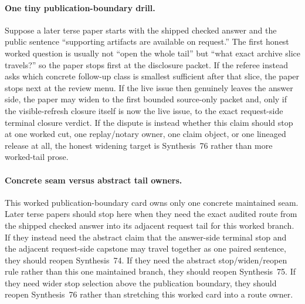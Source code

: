 \documentclass[11pt]{article}
\begin{document}
\paragraph{One tiny publication-boundary drill.}
Suppose a later terse paper starts with the shipped checked answer and the public sentence ``supporting artifacts are available on request.'' The first honest worked question is usually not ``open the whole tail'' but ``what exact archive slice travels?'' so the paper stops first at the disclosure packet. If the referee instead asks which concrete follow-up class is smallest sufficient after that slice, the paper stops next at the review menu. If the live issue then genuinely leaves the answer side, the paper may widen to the first bounded source-only packet and, only if the visible-refresh closure itself is now the live issue, to the exact request-side terminal closure verdict. If the dispute is instead whether this claim should stop at one worked cut, one replay/notary owner, one claim object, or one lineaged release at all, the honest widening target is Synthesis~76 rather than more worked-tail prose.\cite{series:challengeanswerdisclosurepackets,series:challengeanswerreviewmenus,series:publicrequestresponsepacketrefreshresponsepacketclosureverdicts,series:pairedterminalcutoverrules,series:theoremtopublicationspine}
\paragraph{Concrete seam versus abstract tail owners.}
This worked publication-boundary card owns only one concrete maintained seam. Later terse papers should stop here when they need the exact audited route from the shipped checked answer into its adjacent request tail for this worked branch. If they instead need the abstract claim that the answer-side terminal stop and the adjacent request-side capstone may travel together as one paired sentence, they should reopen Synthesis~74. If they need the abstract stop/widen/reopen rule rather than this one maintained branch, they should reopen Synthesis~75. If they need wider stop selection above the publication boundary, they should reopen Synthesis~76 rather than stretching this worked card into a route owner.\cite{series:pairedterminalcitationdiscipline,series:pairedterminalcutoverrules,series:theoremtopublicationspine}
\end{document}
